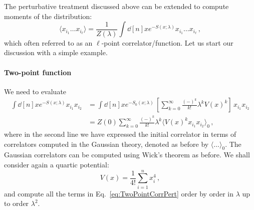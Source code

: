\documentclass[notes.tex]{subfiles}
\begin{document}
The perturbative treatment discussed above can be extended to compute
moments of the distribution:
\begin{equation}
  \label{eq:lPointCorrPert}
  \langle x_{i_1} \ldots x_{i_\ell}\rangle =
  \frac{1}{Z(\lambda)}
  \int \dd[n]{x} e^{-S(x;\lambda)} x_{i_1} \ldots x_{i_\ell}\, ,
\end{equation}
which often referred to as an $\ell$-point correlator/function. Let us start
our discussion with a simple example.

\paragraph{Two-point function}

We need to evaluate
\begin{align}
  \int \dd[n]{x} e^{-S(x;\lambda)} x_{i_1} x_{i_2} & =
  \int \dd[n]{x} e^{-S_0(x;\lambda)}\, \left[\sum_{k=0}^\infty
    \frac{(-)^k}{k!} \lambda^k V(x)^k \right]\, x_{i_1} x_{i_2}              \\
  \label{eq:TwoPointCorrPert}
                                                   & =Z(0) \sum_{k=0}^\infty
  \frac{(-)^k}{k!} \lambda^k \langle V(x)^k x_{i_1} x_{i_2}\rangle_0\, ,
\end{align}
where in the second line we have expressed the initial correlator in
terms of correlators computed in the Gaussian theory, denoted as
before by $\langle \ldots \rangle_0$. The Gaussian correlators can be
computed using Wick's theorem as before. We shall consider again a
quartic potential:
\begin{equation}
  V(x) = \frac{1}{4!} \sum_{i=1}^n x_i^4\, ,
\end{equation}
and compute all the terms in Eq.~\ref{eq:TwoPointCorrPert} order by
order in $\lambda$ up to order $\lambda^2$.
\end{document}
